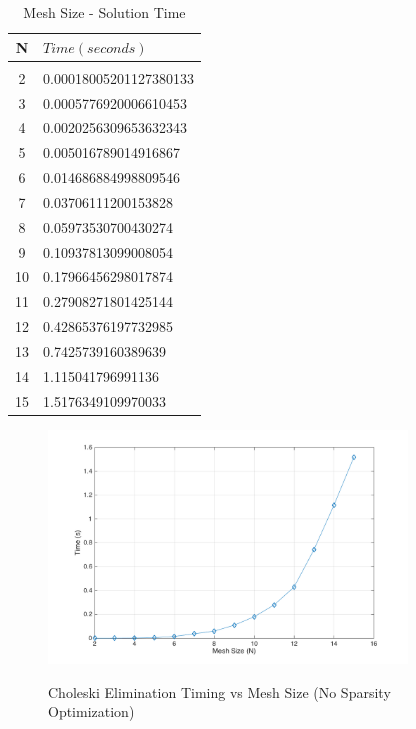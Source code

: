 \documentclass[11pt]{amsart}
\begin{document}
\begin{table}[h!]
    \caption{Mesh Size - Solution Time}
    \label{tbl:time_v_mesh}
    \begin{tabular}{ c| l}
    	\textbf{N} & \textbf{$Time (seconds)$}\\ \hline \\
	2 & 0.00018005201127380133\\
	3 & 0.0005776920006610453\\
	4 & 0.0020256309653632343\\
	5 & 0.005016789014916867\\
	6 & 0.014686884998809546\\
	7 & 0.03706111200153828\\
	8 & 0.05973530700430274\\
	9 & 0.10937813099008054\\
	10 & 0.17966456298017874\\
	11 & 0.27908271801425144\\
	12 & 0.42865376197732985\\
	13 & 0.7425739160389639\\
	14 & 1.115041796991136\\
	15 & 1.5176349109970033
    \end{tabular}
\end{table}
\vspace{3em}
\begin{center}
	\begin{figure}[h]
		\caption{Choleski Elimination Timing vs Mesh Size (No Sparsity Optimization)}
		\includegraphics[width=0.85\textwidth]{assets/t_vs_n_unopt.png}\label{fig:t_n_unopt}
	\end{figure}
\end{center}
\vspace{3em}
\end{document}
